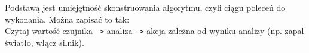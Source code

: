\documentclass[a4paper,12pt, twoside]{article}
\begin{document}
	Podstawą jest umiejętność skonstruowania algorytmu, czyli ciągu poleceń do wykonania. Można zapisać to tak:
	\\Czytaj wartość czujnika \verb|->| analiza \verb|->| akcja zależna od wyniku analizy (np. zapal światło, włącz silnik).
\end{document}
